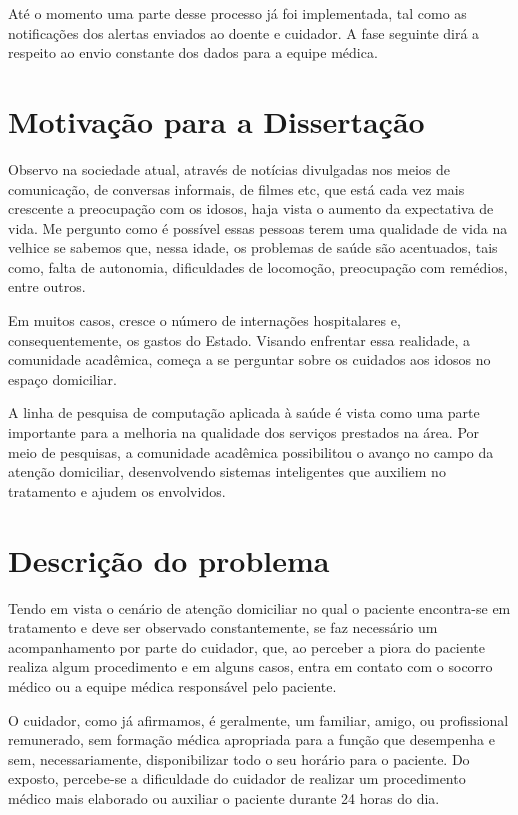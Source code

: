 Até o momento uma parte desse processo já foi implementada, tal como as 
notificações dos alertas enviados ao doente e cuidador. A fase seguinte 
dirá a respeito ao envio constante dos dados para a equipe médica.

\section{Motivação para a Dissertação}\label{sec:motivacao}

Observo na sociedade atual, através de notícias divulgadas nos meios
de comunicação, de conversas informais, de filmes etc, que está cada
vez mais crescente a preocupação com os idosos, haja vista o
aumento da expectativa de vida. Me pergunto como é possível essas pessoas
terem uma qualidade de vida na velhice se sabemos que, nessa idade,
os problemas de saúde são acentuados, tais como, falta de autonomia,
dificuldades de locomoção, preocupação com remédios, entre outros.

Em muitos casos, cresce o número de internações hospitalares e,
consequentemente, os gastos do Estado. Visando enfrentar essa 
realidade, a comunidade acadêmica, %
começa a se perguntar sobre os cuidados aos idosos no espaço domiciliar.

A linha de pesquisa de computação aplicada à saúde é vista como uma parte
importante para a melhoria na qualidade dos serviços prestados na área. Por meio
de pesquisas, a comunidade acadêmica possibilitou o avanço no campo da atenção
domiciliar, desenvolvendo sistemas inteligentes que auxiliem no tratamento e
ajudem os envolvidos.

\section{Descrição do problema}\label{sec:descricao-problema}

Tendo em vista o cenário de atenção domiciliar no qual o paciente
encontra-se em tratamento e deve ser observado constantemente, 
se faz necessário um acompanhamento por parte do cuidador, que, ao perceber 
a piora do paciente realiza algum procedimento e em alguns casos, entra 
em contato com o socorro médico ou a equipe médica responsável pelo paciente.

O cuidador, como já afirmamos, é geralmente, um familiar, amigo, ou profissional
remunerado, sem formação médica apropriada para a função que desempenha  e sem,
necessariamente, disponibilizar todo o seu horário para o paciente. Do exposto,
percebe-se a dificuldade do cuidador de realizar um procedimento médico mais
elaborado ou auxiliar o paciente durante 24 horas do dia.

